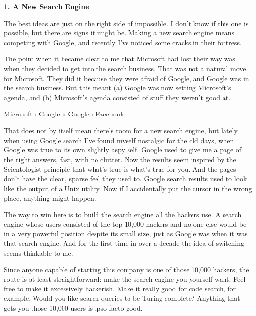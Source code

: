 \textbf{1. A New Search Engine}

The best ideas are just on the right side of
                  impossible. I don't know if this one is possible, but there
                  are signs it might be. Making a new search engine means
                  competing with Google, and recently I've noticed some cracks
                  in their fortress.

The point when it became clear
                  to me that Microsoft had lost their way was when they decided
                  to get into the search business. That was not a natural move
                  for Microsoft. They did it because they were afraid of Google,
                  and Google was in the search business. But this meant (a)
                  Google was now setting Microsoft's agenda, and (b) Microsoft's
                  agenda consisted of stuff they weren't good at.

Microsoft
                  : Google :: Google : Facebook.

That does not by
                  itself mean there's room for a new search engine, but lately
                  when using Google search I've found myself nostalgic for the
                  old days, when Google was true to its own slightly aspy self.
                  Google used to give me a page of the right answers, fast, with
                  no clutter. Now the results seem inspired by the Scientologist
                  principle that what's true is what's true for you. And the
                  pages don't have the clean, sparse feel they used to. Google
                  search results used to look like the output of a Unix utility.
                  Now if I accidentally put the cursor in the wrong place,
                  anything might happen.

The way to win here is to
                  build the search engine all the hackers use. A search engine
                  whose users consisted of the top 10,000 hackers and no one
                  else would be in a very powerful position despite its small
                  size, just as Google was when it was that search engine. And
                  for the first time in over a decade the idea of switching
                  seems thinkable to me.

Since anyone capable of
                  starting this company is one of those 10,000 hackers, the
                  route is at least straightforward: make the search engine you
                  yourself want. Feel free to make it excessively hackerish.
                  Make it really good for code search, for example. Would you
                  like search queries to be Turing complete? Anything that gets
                  you those 10,000 users is ipso facto good.

